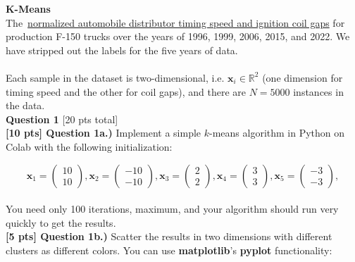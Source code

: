 \documentclass[paper=a4, fontsize=11pt]{scrartcl} %
\author{
    \textbf{YOUR NAME} \\ 
    \textbf{YOUR GIT USERNAME} \\ 
    \textbf{YOUR E-MAIL}
}%
\begin{document}
\maketitle %

{\huge \textbf{K-Means}} \\

The~\href{https://course.ccs.neu.edu/cs6220/homework-4/data/}{normalized automobile distributor timing speed and ignition coil gaps} for production F-150 trucks over the years of 1996, 1999, 2006, 2015, and 2022. We have stripped out the labels for the five years of data.\\
\\
Each sample in the dataset is two-dimensional, i.e. $\textbf{x}_i \in \mathbb{R}^2$ (one dimension for timing speed and the other for coil gaps), and there are $N=5000$ instances in the data.
\\

{\Large \textbf{Question 1} [20 pts total]} \\

\textbf{[10 pts] Question 1a.)} Implement a simple $k$-means algorithm in Python on Colab with the following initialization:

\begin{equation}
\textbf{x}_1 = \left( \begin{matrix} 10 \\ 10 \end{matrix} \right), \textbf{x}_2 = \left( \begin{matrix} -10 \\ -10 \end{matrix} \right),
\textbf{x}_3 = \left( \begin{matrix} 2 \\ 2 \end{matrix} \right),
\textbf{x}_4 = \left( \begin{matrix} 3 \\ 3 \end{matrix} \right),
\textbf{x}_5 = \left( \begin{matrix} -3 \\ -3 \end{matrix} \right),
\nonumber
\end{equation} \\

You need only 100 iterations, maximum, and your algorithm should run very quickly to get the results. \\

\textbf{[5 pts] Question 1b.)} Scatter the results in two dimensions with different clusters as different colors. You can use \textbf{matplotlib}'s \textbf{pyplot} functionality:
\end{document}
